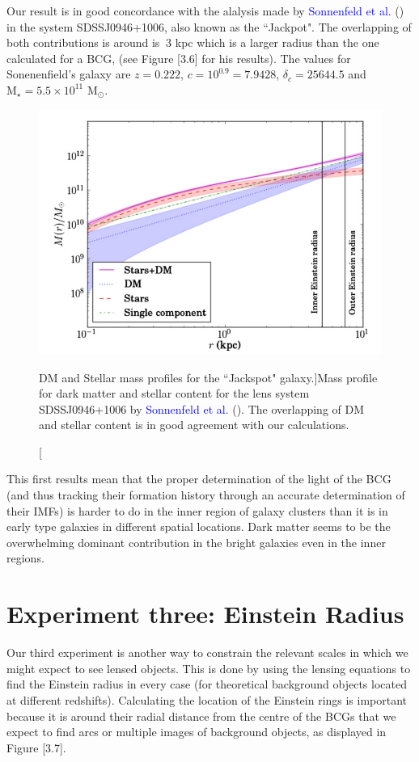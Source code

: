 Our result is in good concordance with the alalysis made by \textcolor{blue}{Sonnenfeld et al.} (\citeyear{Reference15}) in the system SDSSJ0946+1006, also known as the ``Jackpot". The overlapping of both contributions is around is $~3$ kpc which is a larger radius than the one calculated for a BCG, (see Figure [3.6] for his results). The values for Sonenenfield's galaxy are $z=0.222$, $c=10^{0.9}=7.9428$, $\delta_c=25644.5$ and $\text{M}_{\star}=5.5\times 10^{11}$ $\text{M}_{\odot}$.

\begin{figure}[H]
\centering
\includegraphics[width=12cm]{images/sonnenfeld_galaxy.png}
\caption[DM and Stellar mass profiles for the ``Jackspot" galaxy.]{Mass profile for dark matter and stellar content for the lens system SDSSJ0946+1006  by \textcolor{blue}{Sonnenfeld et al.} (\citeyear{Reference15}). The overlapping of DM and stellar content is in good agreement with our calculations.}
\end{figure}

This first results mean that the proper determination of the light of the BCG (and thus tracking their formation history through an accurate determination of their IMFs) is harder to do in the inner region of galaxy clusters than it is in early type galaxies in different spatial locations. Dark matter seems to be the overwhelming dominant contribution in the bright galaxies even in the inner regions.

\section{Experiment three: Einstein Radius}

Our third experiment is another way to constrain the relevant scales in which we might expect to see lensed objects. This is done by using the lensing equations to find the Einstein radius in every case (for theoretical background objects located at different redshifts). Calculating the location of the Einstein rings is important because it is around their radial distance from the centre of the BCGs that we expect to find arcs or multiple images of background objects, as displayed in Figure [3.7]. 

